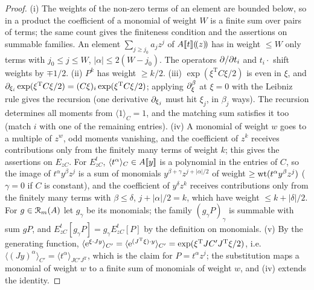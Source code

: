 \begin{proof}
(i) The weights of the non-zero terms of an element are bounded below, so in a product the coefficient of a monomial of weight $W$ is a finite sum over pairs of terms; the same count gives the finiteness condition and the assertions on summable families. An element $\sum_{j\geq j_0}a_jz^j$ of $A[\![ t ]\!](\!(z)\!)$ has in weight $\leq W$ only terms with $j_0\leq j\leq W$, $|\alpha|\leq2(W-j_0)$. The operators $\partial/\partial t_i$ and $t_i\cdot$ shift weights by $\mp1/2$. (ii) $P^k$ has weight $\geq k/2$. (iii) $\exp(\xi^{\mathrm T}C\xi/2)$ is even in $\xi$, and $\partial_{\xi_i}\exp(\xi^{\mathrm T}C\xi/2)=(C\xi)_i\exp(\xi^{\mathrm T}C\xi/2)$; applying $\partial_\xi^\beta$ at $\xi=0$ with the Leibniz rule gives the recursion (one derivative $\partial_{\xi_j}$ must hit $\xi_j$, in $\beta_j$ ways). The recursion determines all moments from $\langle1\rangle_C=1$, and the matching sum satisfies it too (match $i$ with one of the remaining entries). (iv) A monomial of weight $w$ goes to a multiple of $z^w$, odd moments vanishing, and the coefficient of $z^k$ receives contributions only from the finitely many terms of weight $k$; this gives the assertions on $E_{zC}$. For $E^t_{zC}$, $\langle t^\alpha\rangle_C\in A[\![ y ]\!]$ is a polynomial in the entries of $C$, so the image of $t^\alpha y^\beta z^j$ is a sum of monomials $y^{\beta+\gamma}z^{j+|\alpha|/2}$ of weight $\geq\operatorname{wt}(t^\alpha y^\beta z^j)$ ($\gamma=0$ if $C$ is constant), and the coefficient of $y^\delta z^k$ receives contributions only from the finitely many terms with $\beta\leq\delta$, $j+|\alpha|/2=k$, which have weight $\leq k+|\delta|/2$. For $g\in\mathcal{R}_m(A)$ let $g_\gamma$ be its monomials; the family $(g_\gamma P)_\gamma$ is summable with sum $gP$, and $E^t_{zC}[g_\gamma P]=g_\gamma E^t_{zC}[P]$ by the definition on monomials. (v) By the generating function, $\langle\mathrm{e}^{\xi\cdot Jy}\rangle_{C'}=\langle\mathrm{e}^{(J^{\mathrm T}\xi)\cdot y}\rangle_{C'}=\exp(\xi^{\mathrm T}JC'J^{\mathrm T}\xi/2)$, i.e.\ $\langle(Jy)^\alpha\rangle_{C'}=\langle t^\alpha\rangle_{JC'J^{\mathrm T}}$, which is the claim for $P=t^\alpha z^j$; the substitution maps a monomial of weight $w$ to a finite sum of monomials of weight $w$, and (iv) extends the identity.
\end{proof}

